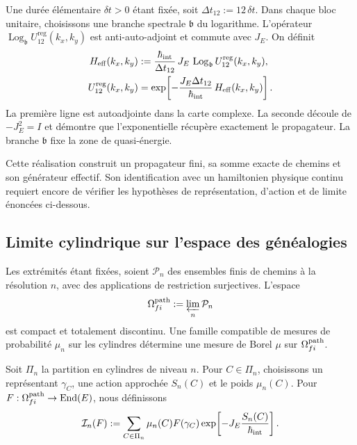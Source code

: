 Une durée élémentaire \(\delta t>0\) étant fixée, soit
\(\Delta t_{12}:=12\,\delta t\). Dans chaque bloc unitaire, choisissons une branche
spectrale \(\mathfrak b\) du logarithme. L’opérateur
\(\operatorname{Log}_{\mathfrak b}U_{12}^{\mathrm{reg}}(k_x,k_y)\) est
anti-auto-adjoint et commute avec \(J_E\). On définit
\begin{equation}
 \begin{aligned}
 H_{\rm eff}(k_x,k_y)
 &:=
 \frac{\hbar_{\rm int}}{\Delta t_{12}}\,
 J_E\,
 \operatorname{Log}_{\mathfrak b}
 U_{12}^{\mathrm{reg}}(k_x,k_y),\\
 U_{12}^{\mathrm{reg}}(k_x,k_y)
 &=
 \exp\!\left[
  -\frac{J_E\Delta t_{12}}{\hbar_{\rm int}}\,
  H_{\rm eff}(k_x,k_y)
 \right].
 \end{aligned}
 \label{x_reciprocidad:eq:hamiltoniano-efectivo-registro-27-rev3}
\end{equation}
La première ligne est autoadjointe dans la carte complexe. La seconde découle de \(-J_E^2=I\) et démontre que l'exponentielle récupère exactement le propagateur. La branche \(\mathfrak b\) fixe la zone de quasi-énergie.

Cette réalisation construit un propagateur fini, sa somme exacte de chemins et
son générateur effectif. Son identification avec un hamiltonien physique continu
requiert encore de vérifier les hypothèses de représentation, d’action et de limite
énoncées ci-dessous.

\subsection{Limite cylindrique sur l’espace des généalogies}

Les extrémités étant fixées, soient \(\mathcal P_n\) des ensembles finis de chemins à la
résolution \(n\), avec des applications de restriction surjectives. L’espace
\[
 \Omega^{\rm path}_{fi}:=\varprojlim_n\mathcal P_n
\]
est compact et totalement discontinu. Une famille compatible de mesures de probabilité \(\mu_n\) sur les cylindres détermine une mesure de Borel \(\mu\) sur \(\Omega^{\rm path}_{fi}\).

Soit \(\Pi_n\) la partition en cylindres de niveau \(n\). Pour
\(C\in\Pi_n\), choisissons un représentant \(\gamma_C\), une action approchée
\(S_n(C)\) et le poids \(\mu_n(C)\). Pour
\(F:\Omega^{\rm path}_{fi}\to\operatorname{End}(E)\), nous définissons
\begin{equation}
 \mathcal I_n(F)
 :=\sum_{C\in\Pi_n}\mu_n(C)F(\gamma_C)
 \exp\!\left[-J_E\frac{S_n(C)}{\hbar_{\rm int}}\right].
 \label{x_reciprocidad:eq:integral-cilindrica-aproximante-rev2}
\end{equation}

